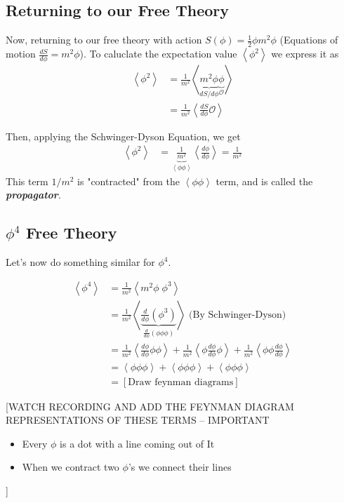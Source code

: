 \documentclass{article}
\newcommand{\mean}[1]{\left\langle #1 \right\rangle}
\begin{document}
\vskip 1cm
\subsection{Returning to our Free Theory}
\vskip 0.5cm
Now, returning to our free theory with action $S(\phi) = \frac{1}{2}\phi m^2 \phi$ (Equations of motion $\frac{dS}{d\phi} = m^2 \phi$). To caluclate the expectation value  $\mean{\phi^2}$ we express it as 
\begin{align*}
  \mean{\phi^2} &= \frac{1}{m^2} \mean{\underbrace{m^2 \phi}_{dS/d\phi} \underbrace{\phi}_{\mathcal{O}}} \\
  &= \frac{1}{m^2} \mean{ \frac{dS}{d\phi} \mathcal{O}}
\end{align*}

Then, applying the Schwinger-Dyson Equation, we get 
\begin{align*}
  \mean{\phi^2} &= \underbrace{\frac{1}{m^2}}_{\mean{\phi \phi}} \mean{\frac{d\phi}{d\phi}} = \frac{1}{m^2}
\end{align*}
This term $1/m^2$ is "contracted" from the $\mean{\phi \phi}$ term, and is called the \emph{\textbf{propagator}}.

\vskip 1cm
\subsection{$\phi^4$ Free Theory}

Let's now do something similar for $\phi^4$.

\begin{align*}
  \mean{\phi^4} &= \frac{1}{m^2} \mean{m^2 \phi \; \phi^3} \\
  &= \frac{1}{m^2} \mean{\underbrace{\frac{d}{d\phi}(\phi^3)}_{\frac{d}{d\phi}(\phi \phi \phi)}} \text{  (By Schwinger-Dyson)} \\
  &= \frac{1}{m^2} \mean{\frac{d\phi}{d\phi} \phi \phi} + \frac{1}{m^2} \mean{\phi \frac{d\phi}{d\phi} \phi}  +\frac{1}{m^2} \mean{\phi \phi\frac{d\phi}{d\phi}} \\
  &= \mean{\phi \phi \phi} + \mean{\phi \phi \phi} + \mean{\phi \phi \phi} \\
  &= [\text{Draw feynman diagrams}]
\end{align*}


[WATCH RECORDING AND ADD THE FEYNMAN DIAGRAM REPRESENTATIONS OF THESE TERMS -- IMPORTANT
\begin{itemize}
  \item Every $\phi$ is a dot with a line coming out of It
  \item When we contract two $\phi$'s we connect their lines
\end{itemize}
]
\end{document}
